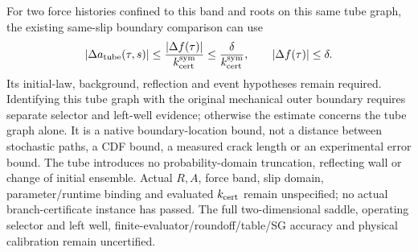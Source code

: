 \documentclass[11pt]{article}
\begin{document}
For two force histories confined to this band and roots on this same tube
graph, the existing same-slip boundary comparison can use
\begin{equation}
 |\Delta a_{\rm tube}(\tau,s)|
 \leq\frac{|\Delta f(\tau)|}{k_{\rm cert}^{\rm sym}}
 \leq\frac{\delta}{k_{\rm cert}^{\rm sym}},
 \qquad |\Delta f(\tau)|\leq\delta .
\end{equation}
Its initial-law, background, reflection and event hypotheses remain required.
Identifying this tube graph with the original mechanical outer boundary
requires separate selector and left-well evidence; otherwise the estimate
concerns the tube graph alone. It is a native boundary-location bound,
not a distance between stochastic paths, a CDF bound, a measured crack
length or an experimental error bound.
The tube introduces no probability-domain truncation, reflecting wall or
change of initial ensemble. Actual $R,A$, force band, slip domain,
parameter/runtime binding and evaluated $k_{\rm cert}$ remain unspecified;
no actual branch-certificate instance has passed.
The full two-dimensional saddle, operating selector and left well,
finite-evaluator/roundoff/table/SG accuracy and physical calibration remain
uncertified.
\end{document}
